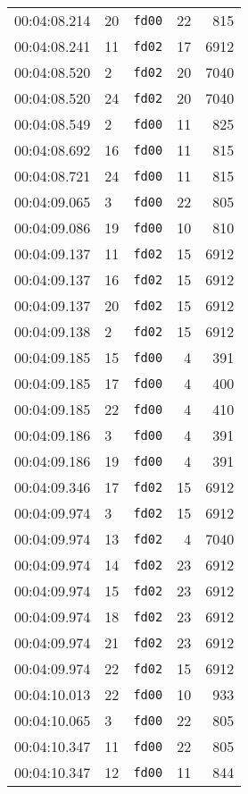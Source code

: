 \documentclass{article}
\begin{document}
\begin{longtable}{lllrr}
00:04:08.214 & 20 & \texttt{fd00} & 22 & 815 \\
00:04:08.241 & 11 & \texttt{fd02} & 17 & 6912 \\
00:04:08.520 & 2 & \texttt{fd02} & 20 & 7040 \\
00:04:08.520 & 24 & \texttt{fd02} & 20 & 7040 \\
00:04:08.549 & 2 & \texttt{fd00} & 11 & 825 \\
00:04:08.692 & 16 & \texttt{fd00} & 11 & 815 \\
00:04:08.721 & 24 & \texttt{fd00} & 11 & 815 \\
00:04:09.065 & 3 & \texttt{fd00} & 22 & 805 \\
00:04:09.086 & 19 & \texttt{fd00} & 10 & 810 \\
00:04:09.137 & 11 & \texttt{fd02} & 15 & 6912 \\
00:04:09.137 & 16 & \texttt{fd02} & 15 & 6912 \\
00:04:09.137 & 20 & \texttt{fd02} & 15 & 6912 \\
00:04:09.138 & 2 & \texttt{fd02} & 15 & 6912 \\
00:04:09.185 & 15 & \texttt{fd00} & 4 & 391 \\
00:04:09.185 & 17 & \texttt{fd00} & 4 & 400 \\
00:04:09.185 & 22 & \texttt{fd00} & 4 & 410 \\
00:04:09.186 & 3 & \texttt{fd00} & 4 & 391 \\
00:04:09.186 & 19 & \texttt{fd00} & 4 & 391 \\
00:04:09.346 & 17 & \texttt{fd02} & 15 & 6912 \\
00:04:09.974 & 3 & \texttt{fd02} & 15 & 6912 \\
00:04:09.974 & 13 & \texttt{fd02} & 4 & 7040 \\
00:04:09.974 & 14 & \texttt{fd02} & 23 & 6912 \\
00:04:09.974 & 15 & \texttt{fd02} & 23 & 6912 \\
00:04:09.974 & 18 & \texttt{fd02} & 23 & 6912 \\
00:04:09.974 & 21 & \texttt{fd02} & 23 & 6912 \\
00:04:09.974 & 22 & \texttt{fd02} & 15 & 6912 \\
00:04:10.013 & 22 & \texttt{fd00} & 10 & 933 \\
00:04:10.065 & 3 & \texttt{fd00} & 22 & 805 \\
00:04:10.347 & 11 & \texttt{fd00} & 22 & 805 \\
00:04:10.347 & 12 & \texttt{fd00} & 11 & 844 \\

\end{longtable}
\end{document}
